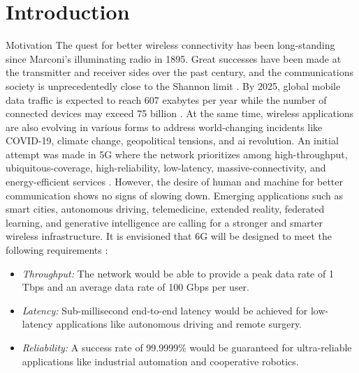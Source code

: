 
\graphicspath{{assets/chapter_1/}}

\chapter{Introduction}\label{ch:introduction}

\begin{section}{Motivation}
	The quest for better wireless connectivity has been long-standing since Marconi's illuminating radio in 1895.
	Great successes have been made at the transmitter and receiver sides over the past century, and the communications society is unprecedentedly close to the Shannon limit \cite{Shannon1948}.
	By 2025, global mobile data traffic is expected to reach {607} exabytes per year \cite{Tariq2020} while the number of connected devices may exceed {75} billion \cite{Georgiev2024}.
	At the same time, wireless applications are also evolving in various forms to address world-changing incidents like COVID-19, climate change, geopolitical tensions, and \gls{ai} revolution.
	An initial attempt was made in 5G where the network prioritizes among high-throughput, ubiquitous-coverage, high-reliability, low-latency, massive-connectivity, and energy-efficient services \cite{Shafi2017}.
	However, the desire of human and machine for better communication shows no signs of slowing down.
	Emerging applications such as smart cities, autonomous driving, telemedicine, extended reality, federated learning, and generative intelligence are calling for a stronger and smarter wireless infrastructure.
	It is envisioned that 6G will be designed to meet the following requirements \cite{Tataria2021,Alsabah2021,Jiang2021}:
	\begin{itemize}
		\item \emph{Throughput:} The network would be able to provide a peak data rate of 1 Tbps and an average data rate of 100 Gbps per user.
		\item \emph{Latency:} Sub-millisecond end-to-end latency would be achieved for low-latency applications like autonomous driving and remote surgery.
		\item \emph{Reliability:} A success rate of 99.9999\% would be guaranteed for ultra-reliable applications like industrial automation and cooperative robotics.

\end{itemize}
\end{section}
